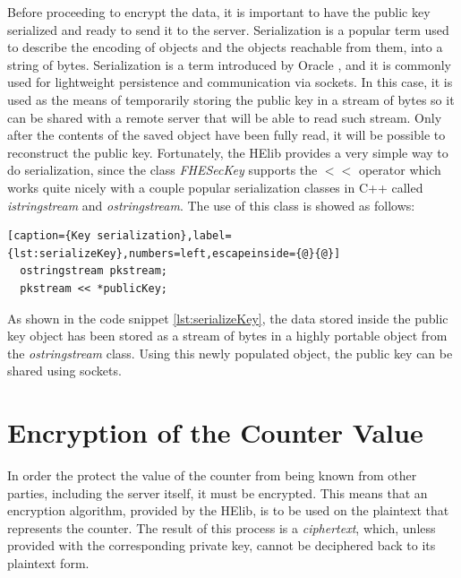 Before proceeding to encrypt the data, it is important to have the public key serialized and ready to send it to the server. Serialization is a popular term used to describe the encoding of objects and the objects reachable from them, into a string of bytes. Serialization is a term introduced by Oracle \cite{oracleserial}, and it is commonly used for lightweight persistence and communication via sockets. In this case, it is used as the means of temporarily storing the public key in a stream of bytes so it can be shared with a remote server that will be able to read such stream. Only after the contents of the saved object have been fully read, it will be possible to reconstruct the public key. Fortunately, the HElib provides a very simple way to do serialization, since the class \textit{FHESecKey} supports the $<<$ operator which works quite nicely with a couple popular serialization classes in C++ called \textit{istringstream} and \textit{ostringstream}. The use of this class is showed as follows: 

\begin{lstlisting}[caption={Key serialization},label={lst:serializeKey},numbers=left,escapeinside={@}{@}]
  ostringstream pkstream;
  pkstream << *publicKey;
\end{lstlisting}

As shown in the code snippet \ref{lst:serializeKey}, the data stored inside the public key object has been stored as a stream of bytes in a highly portable object from the \textit{ostringstream} class. Using this newly populated object, the public key can be shared using sockets.

\section{{Encryption of the Counter Value}}

In order the protect the value of the counter from being known from other parties, including the server itself, it must be encrypted. This means that an encryption algorithm, provided by the HElib, is to be used on the plaintext that represents the counter. The result of this process is a \emph{ciphertext}, which, unless provided with the corresponding private key, cannot be deciphered back to its plaintext form. 

